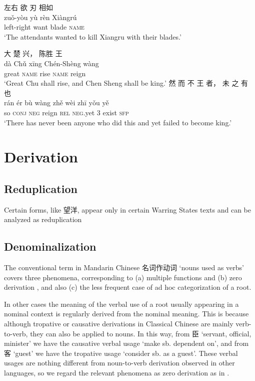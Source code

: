 \documentclass[UTF8, a4paper, oneside, scheme=plain, 12pt]{ctexrep}
\newcommand*{\citesec}[1]{\S~{#1}}
\newcommand*{\citepages}[1]{pp.~{#1}}
\newcommand{\translate}[1]{`#1'}
\newcommand*{\category}[1]{\textsc{#1}}
\begin{document}
\begin{exe}
    \ex
    \glll 左右 欲 刃 相如 \\
    zuǒ-yòu yù rèn Xiàngrú \\
    left-right want blade \category{name} \\
    \glt\translate{The attendants wanted to kill Xiangru with their blades.}
\end{exe}

\begin{exe}
    \ex
    \glll 大 楚 兴， 陈胜 王 \\
    dà Chǔ xīng Chén-Shèng wàng \\
    great \category{name} rise \category{name} reign \\
    \glt\translate{Great Chu shall rise, and Chen Sheng shall be king.}
    \ex
    \glll 然 而 不 王 者， 未 之 有 也 \\
    rán ér bù wàng zhě wèi zhī yǒu yě \\
    so \category{conj} \category{neg} reign \category{rel} \category{neg}.yet 3 exist \category{sfp} \\
    \glt\translate{There has never been anyone who did this and yet failed to become king.}
\end{exe}


\section{Derivation}

\subsection{Reduplication}

Certain forms, like 望洋, appear only in certain Warring States texts and can be analyzed as reduplication \citep[\citepages{77-81}]{sun2008reduplication}

\subsection{Denominalization}\label{sec:pos.verb.noun-to-verb}

The conventional term in Mandarin Chinese 名词作动词 \translate{nouns used as verbs} covers three phenomena,
corresponding to (a) multiple functions and (b) zero derivation \citep[\citesec{11.3}]{dixon2010basic2},
and also (c) the less frequent case of ad hoc categorization of a root.

In other cases the meaning of the verbal use of a root usually appearing in a nominal context
is regularly derived from the nominal meaning.
This is because although tropative or causative derivations in Classical Chinese
are mainly verb-to-verb,
they can also be applied to nouns.
In this way, from 臣 \translate{servant, official, minister}
we have the causative verbal usage \translate{make sb. dependent on},
and from 客 \translate{guest} we have the tropative usage \translate{consider sb. as a guest}.
These verbal usages are nothing different from noun-to-verb derivation observed in other languages,
so we regard the relevant phenomena as zero derivation as in \citet[\citesec{11.3}]{dixon2010basic2}.
\end{document}
